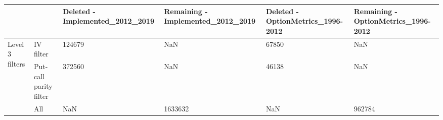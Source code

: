 \begin{tabular}{llllll}
\toprule
 &  & Deleted - Implemented_2012_2019 & Remaining - Implemented_2012_2019 & Deleted - OptionMetrics_1996-2012 & Remaining - OptionMetrics_1996-2012 \\
\midrule
\multirow[t]{3}{*}{Level 3 filters} & IV filter & 124679 & NaN & 67850 & NaN \\
 & Put-call parity filter & 372560 & NaN & 46138 & NaN \\
 & All & NaN & 1633632 & NaN & 962784 \\
\cline{1-6}
\bottomrule
\end{tabular}

